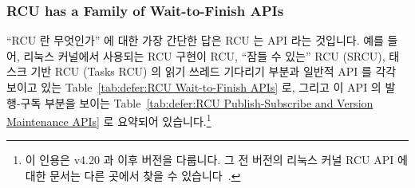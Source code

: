 \subsubsection{RCU has a Family of Wait-to-Finish APIs}
\label{sec:defer:RCU has a Family of Wait-to-Finish APIs}

``RCU 란 무엇인가'' 에 대한 가장 간단한 답은 RCU 는 API 라는 것입니다.
예를 들어, 리눅스 커널에서 사용되는 RCU 구현이 RCU, ``잠들 수 있는'' RCU
(SRCU), 태스크 기반 RCU (Tasks RCU) 의 읽기 쓰레드 기다리기 부분과 일반적 API
를 각각 보이고 있는 Table~\ref{tab:defer:RCU Wait-to-Finish APIs} 로, 그리고
이 API 의 발행-구독 부분을 보이는
Table~\ref{tab:defer:RCU Publish-Subscribe and Version Maintenance APIs}
로 요약되어 있습니다.\footnote{
	이 인용은 v4.20 과 이후 버전을 다룹니다.
	그 전 버전의 리눅스 커널 RCU API 에 대한 문서는 다른 곳에서 찾을 수
	있습니다~\cite{PaulEMcKenney2008WhatIsRCUAPI,PaulEMcKenney2014RCUAPI}.}

